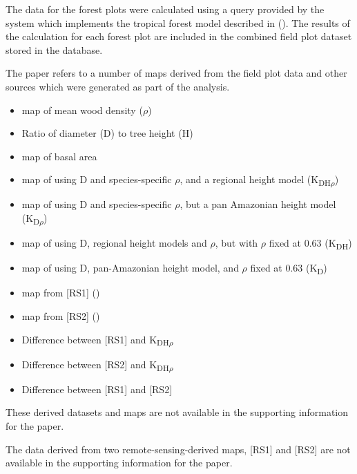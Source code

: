 \documentclass{article}
\begin{document}
The \cite{term-agb} data for the forest plots were calculated
using a \cite{comp-lang-sql} query provided by the \cite{forest-plots}
system which implements the tropical forest model described in
 (\cite{chave-2005}).
The results of the \cite{term-agb} calculation for each
forest plot are included in the combined field plot dataset
stored in the \cite{forest-plots} database.

The paper refers to a number of maps derived from the field plot data
and other sources which were generated as part of the analysis.

\begin{itemize}
\item \cite{kriged} map of mean wood density ($\rho$)
\item Ratio of diameter (D) to tree height (H) \cite{feldpausch-2012}
\item \cite{kriged} map of basal area
\item \cite{kriged} map of \cite{term-agb} using D and species-specific $\rho$, and a regional height model (K\textsubscript{DH$\rho$})
\item \cite{kriged} map of \cite{term-agb} using D and species-specific $\rho$, but a pan Amazonian height model (K\textsubscript{D$\rho$})
\item \cite{kriged} map of \cite{term-agb} using D, regional height models and $\rho$, but with $\rho$ fixed at 0.63 (K\textsubscript{DH})
\item \cite{kriged} map of \cite{term-agb} using D, pan-Amazonian height model, and $\rho$ fixed at 0.63 (K\textsubscript{D})
\end{itemize}

\begin{itemize}
\item \cite{term-agb} map from [RS1] (\cite{saatchi-2011})
\item \cite{term-agb} map from [RS2] (\cite{baccini-2012})
\item Difference between [RS1] and K\textsubscript{DH$\rho$}
\item Difference between [RS2] and K\textsubscript{DH$\rho$}
\item Difference between [RS1] and [RS2]
\end{itemize}

These derived datasets and maps are not available in the supporting information for the paper.

The \cite{term-agb} data derived from two remote-sensing-derived maps,
\cite{saatchi-2011} [RS1] and \cite{baccini-2012} [RS2]
are not available in the supporting information for the paper.
\end{document}
